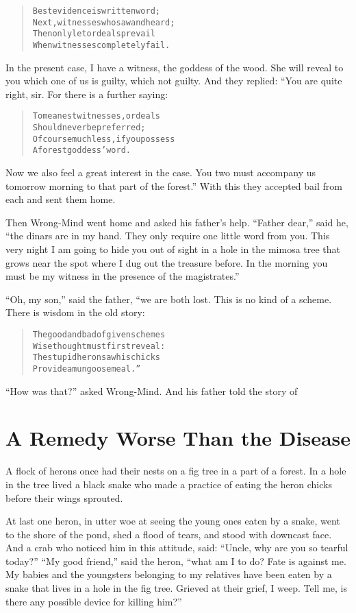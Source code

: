 \documentclass[article, twoside, 14pt]{memoir}
\renewenvironment{verbatim}{%
\begin{quote}%
\vskip -10pt%
\begin{alltt}\normalfont\large}{\end{alltt}%
\end{quote}%
\vskip -10pt
} %
\begin{document}
\begin{verbatim}
Best evidence is written word;
Next, witnesses who saw and heard;
Then only let ordeals prevail
When witnesses completely fail.
\end{verbatim}
In the present case, I have a witness, the goddess of the wood. She
will reveal to you which one of us is guilty, which not
guilty. And they replied: “You are quite right, sir. For there is a
further saying:

\begin{verbatim}
To meanest witnesses, ordeals
    Should never be preferred;
Of course much less, if you possess
    A forest goddess' word.
\end{verbatim}
Now we also feel a great interest in the case. You two must
accompany us tomorrow morning to that part of the forest.” With
this they accepted bail from each and sent them home.

Then Wrong-Mind went home and asked his father's help.
``Father dear,'' said he,
``the dinars are in my hand. They only require one little word from you. This very night I am going to hide you out of sight in a hole in the mimosa tree that grows near the spot where I dug out the treasure before. In the morning you must be my witness in the presence of the magistrates.''

``Oh, my son,'' said the father, “we are both lost. This is no kind
of a scheme. There is wisdom in the old story:

\begin{verbatim}
The good and bad of given schemes
    Wise thought must first reveal:
The stupid heron saw his chicks
    Provide a mungoose meal.”
\end{verbatim}
``How was that?'' asked Wrong-Mind. And his father told the story
of

\chapter{A Remedy Worse Than the Disease}

\label{s30}

A flock of herons once had their nests on a fig tree in a part of a
forest. In a hole in the tree lived a black snake who made a
practice of eating the heron chicks before their wings sprouted.

At last one heron, in utter woe at seeing the young ones eaten by a
snake, went to the shore of the pond, shed a flood of tears, and
stood with downcast face. And a crab who noticed him in this
attitude, said: ``Uncle, why are you so tearful today?''
``My good friend,'' said the heron,
``what am I to do? Fate is against me. My babies and the youngsters belonging to my relatives have been eaten by a snake that lives in a hole in the fig tree. Grieved at their grief, I weep. Tell me, is there any possible device for killing him?''
\end{document}
